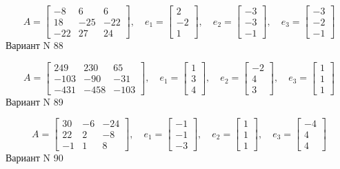 \documentclass[11pt]{report}
\begin{document}
$$A = \left[\begin{matrix}-8 & 6 & 6\\18 & -25 & -22\\-22 & 27 & 24\end{matrix}\right],\quad e_1 = \left[\begin{matrix}2\\-2\\1\end{matrix}\right],\quad e_2 = \left[\begin{matrix}-3\\-3\\-1\end{matrix}\right],\quad e_3 = \left[\begin{matrix}-3\\-2\\-1\end{matrix}\right]$$Вариант N 88

$$A = \left[\begin{matrix}249 & 230 & 65\\-103 & -90 & -31\\-431 & -458 & -103\end{matrix}\right],\quad e_1 = \left[\begin{matrix}1\\3\\4\end{matrix}\right],\quad e_2 = \left[\begin{matrix}-2\\4\\3\end{matrix}\right],\quad e_3 = \left[\begin{matrix}1\\1\\1\end{matrix}\right]$$Вариант N 89

$$A = \left[\begin{matrix}30 & -6 & -24\\22 & 2 & -8\\-1 & 1 & 8\end{matrix}\right],\quad e_1 = \left[\begin{matrix}-1\\-1\\-3\end{matrix}\right],\quad e_2 = \left[\begin{matrix}1\\1\\1\end{matrix}\right],\quad e_3 = \left[\begin{matrix}-4\\4\\4\end{matrix}\right]$$Вариант N 90
\end{document}

